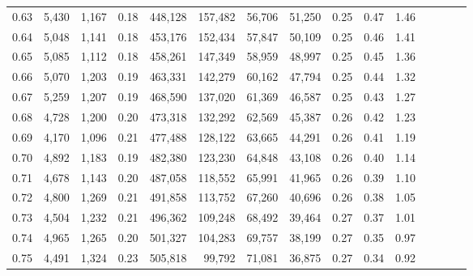 \begin{tabular}{rrrcrrrrrrrrrrr}
0.63 &   5,430 &   1,167 &                                       0.18 &  448,128 &  157,482 &   56,706 &   51,250 &  0.25 &  0.47 &                         1.46 \\
0.64 &   5,048 &   1,141 &                                       0.18 &  453,176 &  152,434 &   57,847 &   50,109 &  0.25 &  0.46 &                         1.41 \\
0.65 &   5,085 &   1,112 &                                       0.18 &  458,261 &  147,349 &   58,959 &   48,997 &  0.25 &  0.45 &                         1.36 \\
0.66 &   5,070 &   1,203 &                                       0.19 &  463,331 &  142,279 &   60,162 &   47,794 &  0.25 &  0.44 &                         1.32 \\
0.67 &   5,259 &   1,207 &                                       0.19 &  468,590 &  137,020 &   61,369 &   46,587 &  0.25 &  0.43 &                         1.27 \\
0.68 &   4,728 &   1,200 &                                       0.20 &  473,318 &  132,292 &   62,569 &   45,387 &  0.26 &  0.42 &                         1.23 \\
0.69 &   4,170 &   1,096 &                                       0.21 &  477,488 &  128,122 &   63,665 &   44,291 &  0.26 &  0.41 &                         1.19 \\
0.70 &   4,892 &   1,183 &                                       0.19 &  482,380 &  123,230 &   64,848 &   43,108 &  0.26 &  0.40 &                         1.14 \\
0.71 &   4,678 &   1,143 &                                       0.20 &  487,058 &  118,552 &   65,991 &   41,965 &  0.26 &  0.39 &                         1.10 \\
0.72 &   4,800 &   1,269 &                                       0.21 &  491,858 &  113,752 &   67,260 &   40,696 &  0.26 &  0.38 &                         1.05 \\
0.73 &   4,504 &   1,232 &                                       0.21 &  496,362 &  109,248 &   68,492 &   39,464 &  0.27 &  0.37 &                         1.01 \\
0.74 &   4,965 &   1,265 &                                       0.20 &  501,327 &  104,283 &   69,757 &   38,199 &  0.27 &  0.35 &                         0.97 \\
0.75 &   4,491 &   1,324 &                                       0.23 &  505,818 &   99,792 &   71,081 &   36,875 &  0.27 &  0.34 &                         0.92 \\

\end{tabular}
